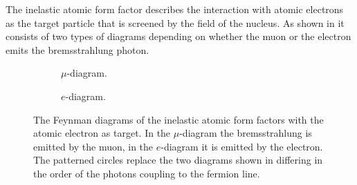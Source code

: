 The inelastic atomic form factor describes the interaction with atomic electrons as the target particle that is screened by the field of the nucleus.
As shown in  it consists of two types of diagrams depending on whether the muon or the electron emits the bremsstrahlung photon.
\begin{figure}
    \begin{subfigure}{0.48\textwidth}
        \centering
        
        \caption{$\mu$-diagram.}
        \label{fig:feyn_brems_mu}
    \end{subfigure}
    \hfill
    \begin{subfigure}{0.48\textwidth}
        \centering
        
        \caption{$e$-diagram.}
        \label{fig:feyn_brems_e}
    \end{subfigure}
    \caption{The Feynman diagrams of the inelastic atomic form factors with the atomic electron as target. In the $\mu$-diagram the bremsstrahlung is emitted by the muon, in the $e$-diagram it is emitted by the electron. The patterned circles replace the two diagrams shown in  differing in the order of the photons coupling to the fermion line.}
    \label{fig:feyn_brems_inel}
\end{figure}

